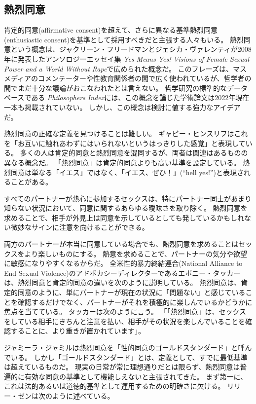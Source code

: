 \documentclass[paper=a4,book,openany]{jlreq} \usepackage{mystyle}
\begin{document}
\subsection{熱烈同意}

肯定的同意(affirmative consent)を超えて、さらに異なる基準{\DDASH}熱烈同意(enthusiastic consent){\DDASH}を基準として採用すべきだと主張する人々もいる。
熱烈同意という概念は、ジャクリーン・フリードマンとジェシカ・ヴァレンティが2008年に発表したアンソロジーエッセイ集 \emph{Yes Means Yes! Visions of Female Sexual Power and a World Without Rape}で広められた概念だ\citep[pp. 308--309]{friedman08:_yes_means_yes}。
このフレーズは、マスメディアのコメンテーターや性教育関係者の間で広く使われているが、哲学者の間でまだ十分な議論がおこなわれたとは言えない。
哲学研究の標準的なデータベースである \emph{Philosophers Index}には、この概念を論じた学術論文は2022年現在一本も掲載されていない。
しかし、この概念は検討に値する強力なアイデアだ。

熱烈同意の正確な定義を見つけることは難しい。
ギャビー・ヒンスリフはこれを「お互いに触れあわずにはいられないというはっきりした感覚」と表現している\citep{hinsliff15:_consen_is_not_enoug}。
多くの人は肯定的同意と熱烈同意を混同するが、両者は関連はあるものの異なる概念だ。
「熱烈同意」は肯定的同意よりも高い基準を設定している。
熱烈同意は単なる「イエス」ではなく、「イエス、ぜひ！」(``hell yes!'')と表現されることがある。

すべてのパートナーが熱心に参加するセックスは、特にパートナー同士があまり知らない状況において、同意に関するあらゆる曖昧さを取り除く。
熱烈同意を求めることで、相手が外見上は同意を示しているとしても発しているかもしれない微妙なサインに注意を向けることができる。

両方のパートナーが本当に同意している場合でも、熱烈同意を求めることはセックスをより楽しいものにする。
熱意を求めることで、パートナーの気分や欲望に敏感になりやすくなるからだ。
全米性的暴力終結連合(National Alliance to End Sexual Violence)のアドボカシーディレクターであるエボニー・タッカーは、熱烈同意と肯定的同意の違いを次のように説明している。
熱烈同意は、肯定的同意のように、単にパートナーが現在の状況に「問題ない」と感じていることを確認するだけでなく、パートナーがそれを積極的に楽しんでいるかどうかに焦点を当てている。
タッカーは次のように言う。
「「熱烈同意」は、セックスをしている相手にきちんと注意を払い、相手がその状況を楽しんでいることを確認することに、より重きが置かれています」\citep{cooney18:_aziz_ansar_alleg_has_peopl}。

ジャミーラ・ジャミルは熱烈同意を「性的同意のゴールドスタンダード」と呼んでいる\citep{jamil18:_what_we_need_learn_aziz_ansar_clust}。
しかし「ゴールドスタンダード」とは、定義として、すでに最低基準は超えているものだ。
現実の日常が常に理想通りだとは限らず、熱烈同意は普遍的に有効な同意の基準として機能しえないと主張されてきた。
まず第一に、これは法的あるいは道徳的基準として運用するための明確さに欠ける。
リリー・ゼンは次のように述べている。
\end{document}
